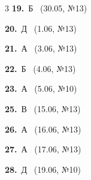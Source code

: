 \documentclass[12pt]{article}
\begin{document}
\ifshowsolutions
{}
\begin{multicols}{3}\noindent
\noindent\textbf{19.}~Б \ {\scriptsize\color{gray}(30.05, №13)}\par
\noindent\textbf{20.}~Д \ {\scriptsize\color{gray}(1.06, №13)}\par
\noindent\textbf{21.}~А \ {\scriptsize\color{gray}(3.06, №13)}\par
\noindent\textbf{22.}~Б \ {\scriptsize\color{gray}(4.06, №13)}\par
\noindent\textbf{23.}~А \ {\scriptsize\color{gray}(5.06, №10)}\par
\noindent\textbf{25.}~В \ {\scriptsize\color{gray}(15.06, №13)}\par
\noindent\textbf{26.}~А \ {\scriptsize\color{gray}(16.06, №13)}\par
\noindent\textbf{27.}~А \ {\scriptsize\color{gray}(17.06, №13)}\par
\noindent\textbf{28.}~Д \ {\scriptsize\color{gray}(19.06, №10)}\par
\end{multicols}
\fi

\endgroup
\end{document}

